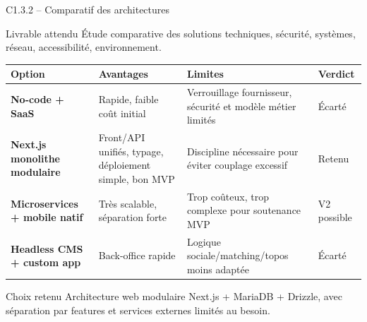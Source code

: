 \documentclass[aspectratio=169,11pt]{beamer}
\newcommand{\competence}[2]{%
  \begin{block}{#1}
    #2
  \end{block}
}
\begin{document}
\begin{frame}{C1.3.2 -- Comparatif des architectures}
  \competence{Livrable attendu}{Étude comparative des solutions techniques, sécurité, systèmes, réseau, accessibilité, environnement.}
  \tiny
  \begin{tabularx}{\textwidth}{>{\bfseries}p{2.5cm} X X X}
    Option & Avantages & Limites & Verdict \\
    \hline
    No-code + SaaS & Rapide, faible coût initial & Verrouillage fournisseur, sécurité et modèle métier limités & Écarté \\
    Next.js monolithe modulaire & Front/API unifiés, typage, déploiement simple, bon MVP & Discipline nécessaire pour éviter couplage excessif & Retenu \\
    Microservices + mobile natif & Très scalable, séparation forte & Trop coûteux, trop complexe pour soutenance MVP & V2 possible \\
    Headless CMS + custom app & Back-office rapide & Logique sociale/matching/topos moins adaptée & Écarté \\
  \end{tabularx}
  \vspace{0.2cm}
  \begin{block}{Choix retenu}
    Architecture web modulaire Next.js + MariaDB + Drizzle, avec séparation par features et services externes limités au besoin.
  \end{block}
\end{frame}
\end{document}
